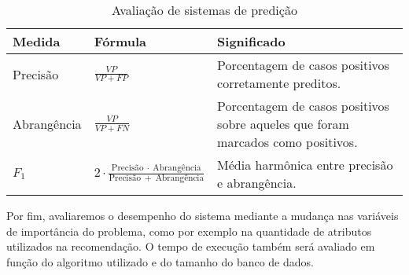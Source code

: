 

\begin{table}[hp]
\begin{center}
    \caption{Avaliação de sistemas de predição}
    \label{tab:avaliacao-predicao}
    \begin{tabular}{  | >{\arraybackslash} m{3cm} | >{\centering\arraybackslash} m{4cm} | >{\arraybackslash} m{6cm} | }
    \hline
    \textbf{Medida} & \textbf{Fórmula} & \textbf{Significado} \\ \hline
    Precisão &  $\frac{VP}{VP+FP}$ & Porcentagem de casos positivos corretamente preditos. \\ \hline                            
    Abrangência & $\frac{VP}{VP+FN}$ & Porcentagem de casos positivos sobre aqueles que foram marcados como positivos. \\ \hline
    $F_1$ &  $2 \cdot \frac{\mathrm{Precisão}~\cdot~\mathrm{Abrangência}}{\mathrm{Precisão}~+~\mathrm{Abrangência}}$ & Média harmônica entre precisão e abrangência. \\ \hline
    \end{tabular}
\end{center}
\end{table}

Por fim, avaliaremos o desempenho do sistema mediante a mudança nas variáveis de importância do problema, como por exemplo na quantidade de atributos utilizados na recomendação. O tempo de execução também será avaliado em função do algoritmo utilizado e do tamanho do banco de dados.


